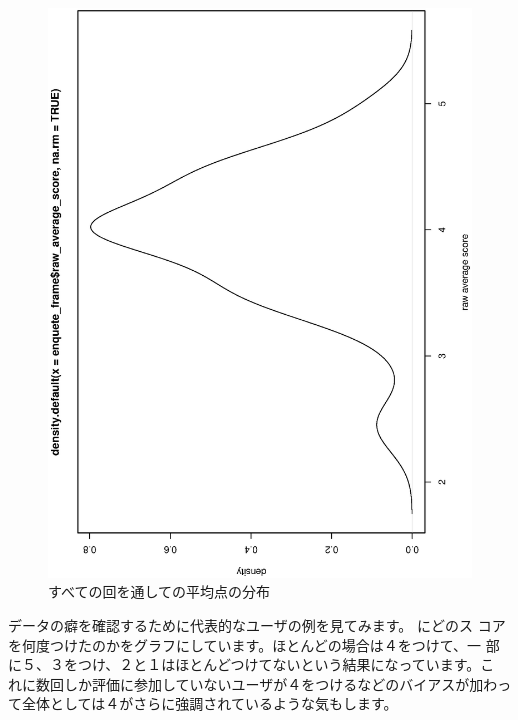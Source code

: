 \documentclass[mingoth,a4paper]{jsarticle}
\begin{document}
\begin{figure}[h]
\begin{center}
 \includegraphics[width=0.8\hsize,angle=270]{image201301/raw_average_score_density.eps}

 \caption{すべての回を通しての平均点の分布}
 \label{fig:all-enquete-score-distribution}
\end{center}
\end{figure}

データの癖を確認するために代表的なユーザの例を見てみます。
にどのス
コアを何度つけたのかをグラフにしています。ほとんどの場合は４をつけて、一
部に５、３をつけ、２と１はほとんどつけてないという結果になっています。こ
れに数回しか評価に参加していないユーザが４をつけるなどのバイアスが加わっ
て全体としては４がさらに強調されているような気もします。
\end{document}
